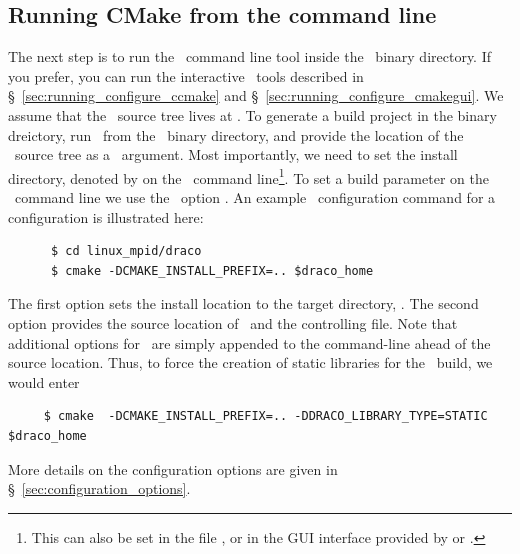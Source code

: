 \subsection{Running CMake from the command line}
\label{sec:running_configure_cmd_line}

The next step is to run the \cmake\ command line tool inside the \draco\ binary directory.  If you prefer, you can run the interactive \cmake\ tools described in \S~\ref{sec:running_configure_ccmake} and \S~\ref{sec:running_configure_cmakegui}.  We assume that the \draco\ source tree lives at \dracohome.  
To generate a build project in the binary dreictory, run \cmake\ from the \draco\ binary directory,  and provide the location of the \draco\ source tree as a \cmake\ argument.  Most importantly, we need to set the
install directory, denoted by  on the \cmake\ command line\footnote{This can also be set in the file , or in the GUI interface provided by  or .}.  To set a build parameter on the \cmake\ command line we use the \cmake\ option .  An example \cmake\ configuration command for a   configuration is illustrated here:
\begin{verbatim}
      $ cd linux_mpid/draco
      $ cmake -DCMAKE_INSTALL_PREFIX=.. $draco_home
\end{verbatim}
The first option sets the install location to the target directory, .  The second option provides the source location of \draco\ and the controlling  file.
Note that additional options for \cmake\ are simply
appended to the command-line ahead of the source location.  Thus, to force the creation of static libraries for the \draco\ build,
we would enter
\begin{verbatim}
     $ cmake  -DCMAKE_INSTALL_PREFIX=.. -DDRACO_LIBRARY_TYPE=STATIC $draco_home
\end{verbatim}
More details on the configuration options are given in
\S~\ref{sec:configuration_options}.

